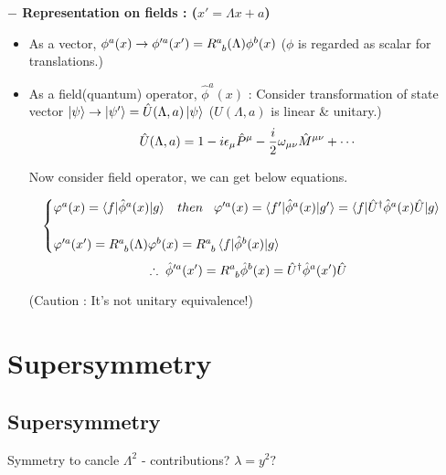 \documentclass[11pt,letterpaper]{article}
\begin{document}
\VS

{\bfseries $-$ Representation on fields : ($x'=\Lambda x + a$)}

\vs

\begin{itemize}
	\item As a vector, $\phi^a(x)\rightarrow \phi'^a(x') = \tensor{R}{^a _b}(\Lambda) \phi^{b} (x)$ \quad ($\phi$ is regarded as scalar for translations.)
	\item As a field(quantum) operator, $\hat{\phi}^a(x)$ \newline
	: Consider transformation of state vector $\ket{\psi}\rightarrow\ket{\psi'}=\hat{U}(\Lambda, a)\ket{\psi}$ \quad ($\hat{U}(\Lambda, a)$ is linear \& unitary.) \newline
	$$\hat{U}(\Lambda,a) = 1-i\epsilon_\mu \hat{P}^{\mu} -\frac{i}{2}\omega_{\mu\nu}\hat{M}^{\mu\nu}+\cdots$$
	
	\vs
	
	Now consider field operator, we can get below equations.
	
	$$
	\begin{cases}
		\varphi^a(x) = \braket{f|\hat{\phi}^a(x)|g} \HS then \HS 
			\varphi'^a(x) = \braket{f'|\hat{\phi}^a(x)|g'} =\braket{f|\hat{U}^\dagger \hat{\phi}^a(x)\hat{U}|g}\\
			\\
		\varphi'^a(x') = \tensor{R}{^a_b}(\Lambda)\varphi^b(x) = \tensor{R}{^a_b}\braket{f|\hat{\phi}^b(x)|g}
	\end{cases}
	$$ \newline
	$$\therefore \hs \hat{\phi}'^a(x') =  \tensor{R}{^a_b}\hat{\phi}^b(x) = \hat{U}^\dagger \hat{\phi}^a(x')\hat{U}$$
	\begin{center}
		(Caution : It's not unitary equivalence!)
	\end{center}
	
\end{itemize}

\newpage

\section{Supersymmetry}

\subsection{Supersymmetry}

\vs

Symmetry to cancle $\Lambda^2$ - contributions?
$\lambda = y^2?$ \quad {\bfseries [Supersymmetry]}
\end{document}
